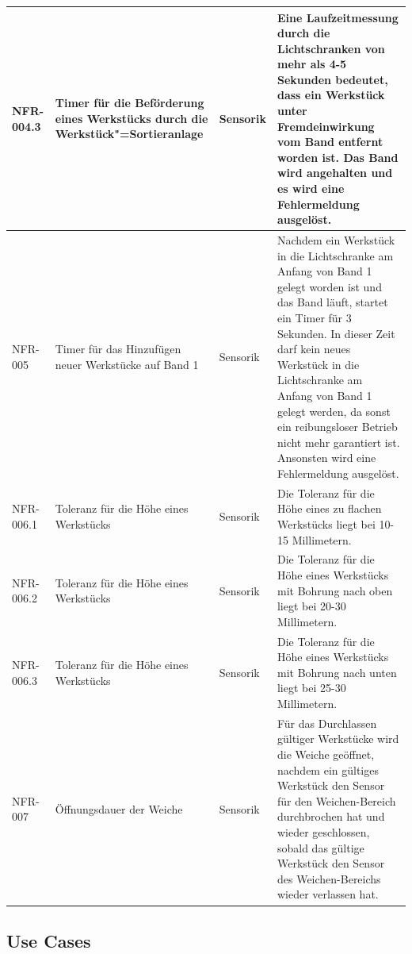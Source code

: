 \documentclass[oneside,a4paper,titlepage]{scrartcl} %
\begin{document}
\begin{small}
\begin{longtable}{|p{2cm}|p{4cm}|p{1.5cm}|p{5.5cm}|}
  \hline
  \rowcolor{lightgray} NFR-004.3 & Timer für die Beförderung eines Werkstücks durch die Werkstück"=Sortieranlage & Sensorik & Eine Laufzeitmessung durch die Lichtschranken von mehr als 4-5 Sekunden bedeutet, dass ein Werkstück unter Fremdeinwirkung vom Band entfernt worden ist. Das Band wird angehalten und es wird eine Fehlermeldung ausgelöst.\\
  \hline
  NFR-005 & Timer für das Hinzufügen neuer Werkstücke auf Band 1 & Sensorik & Nachdem ein Werkstück in die Lichtschranke am Anfang von Band 1 gelegt worden ist und das Band läuft, startet ein Timer für 3 Sekunden. In dieser Zeit darf kein neues Werkstück in die Lichtschranke am Anfang von Band 1 gelegt werden, da sonst ein reibungsloser Betrieb nicht mehr garantiert ist. Ansonsten wird eine Fehlermeldung ausgelöst.\\
  \hline
  \rowcolor{lightgray} NFR-006.1 & Toleranz für die Höhe eines Werkstücks & Sensorik & Die Toleranz für die Höhe eines zu flachen Werkstücks liegt bei 10-15 Millimetern.\\
  \hline
  \rowcolor{lightgray} NFR-006.2 & Toleranz für die Höhe eines Werkstücks & Sensorik & Die Toleranz für die Höhe eines Werkstücks mit Bohrung nach oben liegt bei 20-30 Millimetern.\\
  \hline
  \rowcolor{lightgray} NFR-006.3 & Toleranz für die Höhe eines Werkstücks & Sensorik & Die Toleranz für die Höhe eines Werkstücks mit Bohrung nach unten liegt bei 25-30 Millimetern.\\
  \hline
  NFR-007 & Öffnungsdauer der Weiche & Sensorik & Für das Durchlassen gültiger Werkstücke wird die Weiche geöffnet, nachdem ein gültiges Werkstück den Sensor
  für den Weichen-Bereich durchbrochen hat und wieder geschlossen, sobald das
  gültige Werkstück den Sensor des Weichen-Bereichs wieder verlassen hat.\\
  \hline
 \end{longtable}
\end{small}

\newpage

\subsection{Use Cases}
\end{document}

